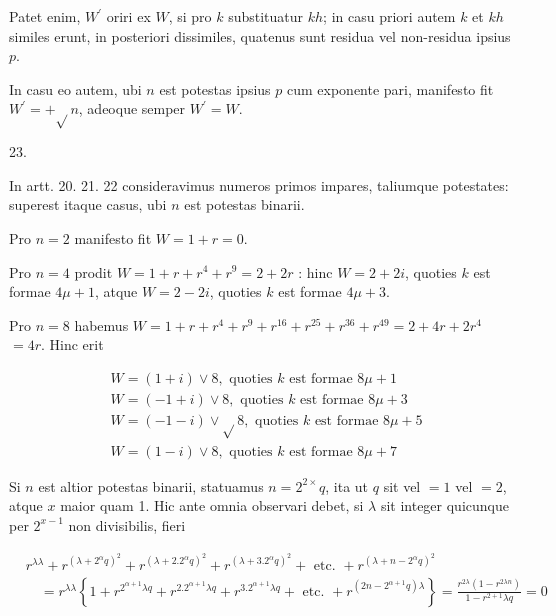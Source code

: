 \documentclass[10pt]{article}
\begin{document}
Patet enim, \(W^{\prime}\) oriri ex \(W\), si pro \(k\) substituatur \(k h\); in casu priori autem \(k\) et \(k h\) similes erunt, in posteriori dissimiles, quatenus sunt residua vel non-residua ipsius \(p\).

In casu eo autem, ubi \(n\) est potestas ipsius \(p\) cum exponente pari, manifesto fit \(W^{\prime}=+\sqrt{ } n\), adeoque semper \(W^{\prime}=W\).

23.

In artt. 20. 21. 22 consideravimus numeros primos impares, taliumque potestates: superest itaque casus, ubi \(n\) est potestas binarii.

Pro \(n=2\) manifesto fit \(W=1+r=0\).

Pro \(n=4\) prodit \(W=1+r+r^{4}+r^{9}=2+2 r\) : hinc \(W=2+2 i\), quoties \(k\) est formae \(4 \mu+1\), atque \(W=2-2 i\), quoties \(k\) est formae \(4 \mu+3\).

Pro \(n=8\) habemus \(W=1+r+r^{4}+r^{9}+r^{16}+r^{25}+r^{36}+r^{49}=2+4 r+2 r^{4}\) \(=4 r\). Hinc erit

\[
\begin{aligned}
& W=(1+i) \vee 8, \text { quoties } k \text { est formae } 8 \mu+1 \\
& W=(-1+i) \vee 8, \text { quoties } k \text { est formae } 8 \mu+3 \\
& W=(-1-i) \vee \sqrt{ } 8, \text { quoties } k \text { est formae } 8 \mu+5 \\
& W=(1-i) \vee 8, \text { quoties } k \text { est formae } 8 \mu+7
\end{aligned}
\]

Si \(n\) est altior potestas binarii, statuamus \(n=2^{2 \times} q\), ita ut \(q\) sit vel \(=1\) vel \(=2\), atque \(x\) maior quam 1. Hic ante omnia observari debet, si \(\lambda\) sit integer quicunque per \(2^{x-1}\) non divisibilis, fieri

\[
\begin{aligned}
& r^{\lambda \lambda}+r^{\left(\lambda+2^{\alpha} q\right)^{2}}+r^{\left(\lambda+2.2^{\alpha} q\right)^{2}}+r^{\left(\lambda+3.2^{\alpha} q\right)^{2}}+\text { etc. }+r^{\left(\lambda+n-2^{\alpha} q\right)^{2}} \\
& \quad=r^{\lambda \lambda}\left\{1+r^{2^{\alpha+1} \lambda q}+r^{2.2^{\alpha+1} \lambda q}+r^{3.2^{\alpha+1} \lambda q}+\text { etc. }+r^{\left(2 n-2^{\alpha+1} q\right) \lambda}\right\}=\frac{r^{2 \lambda}\left(1-r^{2 \lambda n}\right)}{1-r^{2+1} \lambda q}=0
\end{aligned}
\]
\end{document}
